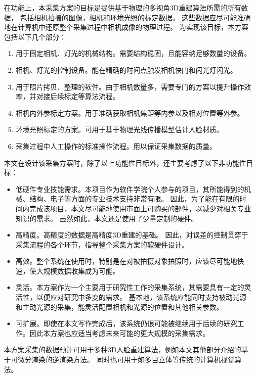 在功能上，本采集方案的目标是提供基于物理的多视角3D重建算法所需的所有数据，
包括相机拍摄的图像，相机和环境光照的标定数据。
这些数据应尽可能准确地在计算机中还原整个采集过程中相机成像的物理过程。
为实现该目标，本方案包括以下几个部分：
\begin{enumerate}
\item 用于固定相机、灯光的机械结构。需要结构稳固，且能容纳足够数量的设备。
\item 相机、灯光的控制设备。能在精确的时间点触发相机快门和闪光灯闪光。
\item 用于照片拷贝、整理的软件。由于相机数量多，需要专门的方案以提升操作效率，并对接后续标定等算法流程。
\item 相机内外参标定方案。用于准确获取相机焦距等内参以及相对位置等外参。
\item 环境光照标定的方案。可用于基于物理光线传播模型估计人脸材质。
\item 采集过程中人工操作的标准操作流程。用以保证采集数据的质量。
\end{enumerate}
本文在设计该采集方案时，除了以上功能性目标外，还主要考虑了以下非功能性目标：
\begin{itemize}
\item 低硬件专业技能需求。本项目作为软件学院个人参与的项目，其所能得到的机械、结构、电子等方面的专业技术支持非常有限。
因此，为了能在有限的时间内完成该项目，本文尽可能地使用市面上可购买的部件，以减少对相关专业知识的需求。
虽然如此，本文还是使用了少量定制的硬件。

\item 高精度。高精度的数据是高精度3D重建的基础。
因此，对误差的控制贯穿于采集流程的各个环节，指导整个采集方案的软硬件设计。

\item 高效。整个系统在使用时，特别是在对被拍摄对象拍照时，应该尽可能地快速，使大规模数据收集成为可能。

\item 灵活。本方案作为一个主要用于研究性工作的采集系统，其需要具有一定的灵活性，以便应对研究中多变的需求。
基本地，该系统应能同时支持被动光源和主动光源的采集，能灵活配置相机和光源的位置和其他相关参数。

\item 可扩展。即使在本文写作完成后，该系统仍很可能被继续用于后续的研究工作。因此本方案也应适当考虑未来可能的更大规模的采集需求。

\end{itemize}

本方案采集的数据预计可用于多种3D人脸重建算法，例如本文其他部分介绍的基于可微分渲染的逆渲染方法。
同时也可用于如多目立体等传统的计算机视觉算法。

